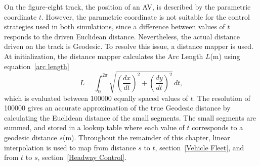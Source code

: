 On the figure-eight track, the position of an AV, is described by the parametric coordinate \(t\). However, the parametric coordinate is not suitable for the control strategies used in both simulations, since a difference between values of \(t\)  responds to the driven Euclidean distance. Nevertheless, the actual distance driven on the track is Geodesic. To resolve this issue, a distance mapper is used. At initialization, the distance mapper calculates the Arc Length \(L\)(m) using equation~\ref{arc length}
\begin{equation}
\label{arc length}
L =
\int_0^{2\pi}
\sqrt{
\left(\frac{dx}{dt}\right)^2 +
\left(\frac{dy}{dt}\right)^2
}
\,dt,
\end{equation} which is evaluated between 100000 equally spaced values of \(t\). The resolution of 100000 gives an accurate approximation of the true Geodesic distance by calculating the Euclidean distance of the small segments. The small segments are summed, and stored in a lookup table where each value of \(t\) corresponds to a geodesic distance \(s\)(m). Throughout the remainder of this chapter, linear interpolation is used to map from distance \(s\) to \(t\), section~\ref{Vehicle Fleet},  and from \(t\) to \(s\), section~\ref{Headway Control}.
